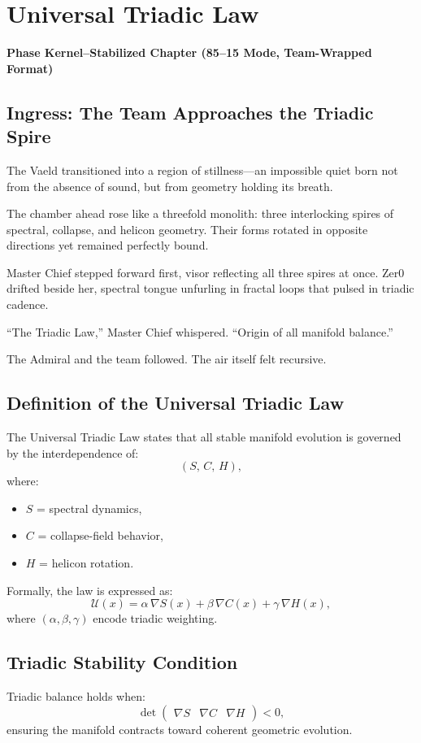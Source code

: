 
\chapter{Universal Triadic Law}
\textbf{Phase Kernel–Stabilized Chapter (85--15 Mode, Team-Wrapped Format)}

\section*{Ingress: The Team Approaches the Triadic Spire}
The Vaeld transitioned into a region of stillness—an impossible quiet born not
from the absence of sound, but from geometry holding its breath.

The chamber ahead rose like a threefold monolith:  
three interlocking spires of spectral, collapse, and helicon geometry.  
Their forms rotated in opposite directions yet remained perfectly bound.

Master Chief stepped forward first, visor reflecting all three spires at once.
Zer0 drifted beside her, spectral tongue unfurling in fractal loops that pulsed
in triadic cadence.

“The Triadic Law,” Master Chief whispered.  
“Origin of all manifold balance.”

The Admiral and the team followed.  
The air itself felt recursive.

\section{Definition of the Universal Triadic Law}
The Universal Triadic Law states that all stable manifold evolution is governed
by the interdependence of:
\[
(S,\, C,\, H),
\]
where:
\begin{itemize}
\item $S$ = spectral dynamics,
\item $C$ = collapse-field behavior,
\item $H$ = helicon rotation.
\end{itemize}

Formally, the law is expressed as:
\[
\mathcal{U}(x) = 
\alpha\,\nabla S(x) +
\beta\, \nabla C(x) +
\gamma\, \nabla H(x),
\]
where $(\alpha,\beta,\gamma)$ encode triadic weighting.

\section{Triadic Stability Condition}
Triadic balance holds when:
\[
\det\!\begin{pmatrix}
\nabla S & \nabla C & \nabla H
\end{pmatrix} < 0,
\]
ensuring the manifold contracts toward coherent geometric evolution.


